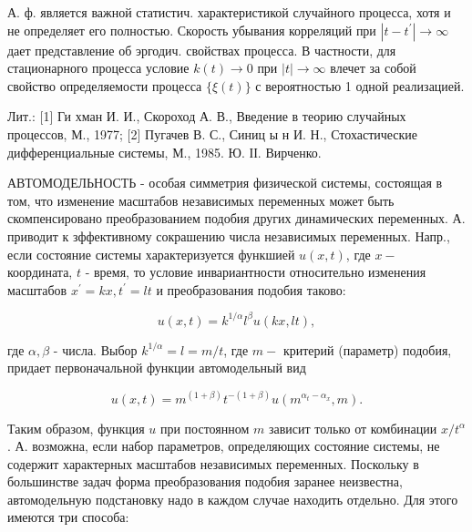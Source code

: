 \documentclass[10pt]{article}
\begin{document}
А. ф. является важной статистич. характеристикой случайного процесса, хотя и не определяет его полностью. Скорость убывания корреляций при $\left|t-t^{\prime}\right| \rightarrow \infty$ дает представление об эргодич. свойствах процесса. В частности, для стационарного процесса условие $k(t) \rightarrow 0$ при $|t| \rightarrow \infty$ влечет за собой свойство определяемости процесса $\{\xi(t)\}$ с вероятностью 1 одной реализацией.



Лит.: [1] Ги хман И. И., Скороход А. В., Введение в теорию случайных процессов, М., 1977; [2] Пугачев В. С., Синиц ы н И. Н., Стохастические дифференциальные системы, М., 1985. Ю. ІІ. Вирченко.



АВТОМОДЕЛЬНОСТЬ - особая симметрия физической системы, состоящая в том, что изменение масштабов независимых переменных может быть скомпенсировано преобразованием подобия других динамических переменных. А. приводит к зффективному сокрашению числа независимых переменных. Напр., если состояние системы характеризуется функшией $u(x, t)$, где $x-$ координата, $t$ - время, то условие инвариантности относительно изменения масштабов $x^{\prime}=k x, t^{\prime}=l t$ и преобразования подобия таково:



\[

u(x, t)=k^{1 / \alpha} l^{\beta} u(k x, l t),

\]



где $\alpha, \beta$ - числа. Выбор $k^{1 / \alpha}=l=m / t$, где $m-$ критерий (параметр) подобия, придает первоначальной функции автомодельный вид



\[

u(x, t)=m^{(1+\beta)} t^{-(1+\beta)} u\left(m^{\alpha_{t}-\alpha_{x}}, m\right) .

\]



Таким образом, функция $u$ при постоянном $m$ зависит только от комбинации $x / t^{\alpha}$. А. возможна, если набор параметров, определяющих состояние системы, не содержит характерных масштабов независимых переменных. Поскольку в большинстве задач форма преобразования подобия заранее неизвестна, автомодельную подстановку надо в каждом случае находить отдельно. Для этого имеются три способа:
\end{document}
